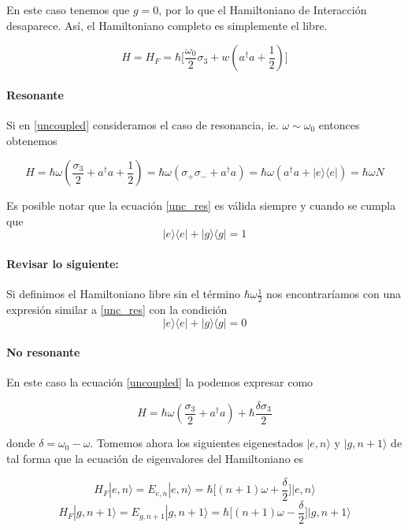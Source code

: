 \documentclass[spanish]{article}
\begin{document}
En este caso tenemos que $g = 0$, por lo que el Hamiltoniano de Interacción desaparece. Así, el Hamiltoniano completo es simplemente el libre. 

\begin{equation}
H = H_F = \hbar\bigg[\frac{\omega_0}{2}\sigma_3+w(a^\dagger a+\frac{1}{2})\bigg]
\label{uncoupled}
\end{equation}

\paragraph{Resonante} Si en \ref{uncoupled} consideramos el caso de resonancia, ie. $\omega \sim \omega_0$ entonces obtenemos

\begin{equation}
H = \hbar \omega (\frac{\sigma_3}{2}+a^\dagger a + \frac{1}{2}) = \hbar \omega ( \sigma_+\sigma_- + a^\dagger a ) = \hbar \omega (a^\dagger a + |e\rangle \langle e |) = \hbar \omega N 
\label{unc_res}
\end{equation}

 Es posible notar que la ecuación \ref{unc_res} es válida siempre y cuando se cumpla que $$ |e\rangle \langle e| + |g\rangle \langle g | = 1 $$ 
 
\paragraph{Revisar lo siguiente:} Si definimos el Hamiltoniano libre sin el término $\hbar \omega \frac{1}{2}$ nos encontraríamos con una expresión similar a \ref{unc_res} con la condición $$ |e\rangle \langle e| + |g\rangle \langle g | = 0 $$ 

\paragraph{No resonante} En este caso la ecuación \ref{uncoupled} la podemos expresar como 

\begin{equation}
H = \hbar \omega ( \frac{\sigma_3}{2}+a^\dagger a) +\hbar \frac{\delta \sigma_3}{2}
\label{unc}
\end{equation}

donde $\delta = \omega_0 - \omega $. Tomemos ahora los siguientes eigenestados  $|e,n\rangle$ y $|g,n+1\rangle $ de tal forma que la ecuación de eigenvalores del Hamiltoniano es

\begin{equation}
H_F|e,n\rangle = E_{e,n}|e,n\rangle = \hbar \bigg[(n+1)\omega + \frac{\delta}{2}\bigg]|e,n\rangle
\end{equation}
\begin{equation}
H_F|g,n+1\rangle = E_{g,n+1}|g,n+1\rangle = \hbar \bigg[(n+1)\omega - \frac{\delta}{2}\bigg]|g,n+1\rangle
\end{equation}
\end{document}
